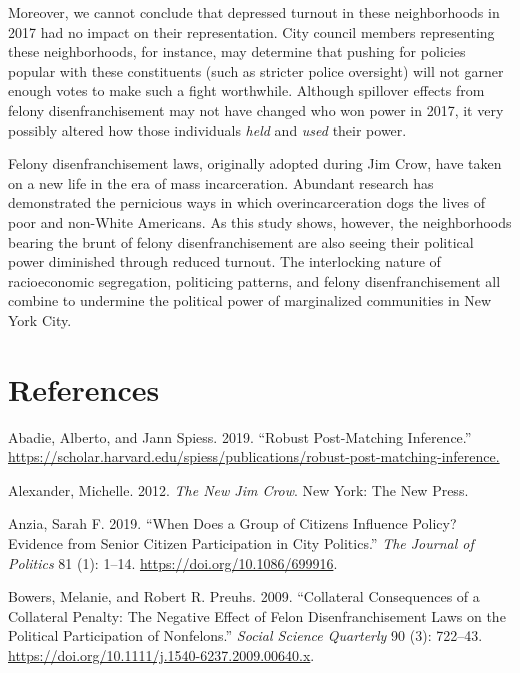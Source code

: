 \documentclass[12pt,]{article}
\begin{document}
Moreover, we cannot conclude that depressed turnout in these neighborhoods in 2017 had no impact on their representation. City council members representing these neighborhoods, for instance, may determine that pushing for policies popular with these constituents (such as stricter police oversight) will not garner enough votes to make such a fight worthwhile. Although spillover effects from felony disenfranchisement may not have changed who won power in 2017, it very possibly altered how those individuals \emph{held} and \emph{used} their power.

Felony disenfranchisement laws, originally adopted during Jim Crow, have taken on a new life in the era of mass incarceration. Abundant research has demonstrated the pernicious ways in which overincarceration dogs the lives of poor and non-White Americans. As this study shows, however, the neighborhoods bearing the brunt of felony disenfranchisement are also seeing their political power diminished through reduced turnout. The interlocking nature of racioeconomic segregation, politicing patterns, and felony disenfranchisement all combine to undermine the political power of marginalized communities in New York City.

\newpage

\hypertarget{references}{%
\section*{References}\label{references}}

\setlength{\parindent}{-0.5in}
\setlength{\leftskip}{0.5in}

\noindent

\hypertarget{refs}{}
\leavevmode\hypertarget{ref-Abadie2019}{}%
Abadie, Alberto, and Jann Spiess. 2019. ``Robust Post-Matching Inference.'' \url{https://scholar.harvard.edu/spiess/publications/robust-post-matching-inference.}

\leavevmode\hypertarget{ref-Alexander2012}{}%
Alexander, Michelle. 2012. \emph{The New Jim Crow}. New York: The New Press.

\leavevmode\hypertarget{ref-Anzia2019}{}%
Anzia, Sarah F. 2019. ``When Does a Group of Citizens Influence Policy? Evidence from Senior Citizen Participation in City Politics.'' \emph{The Journal of Politics} 81 (1): 1--14. \url{https://doi.org/10.1086/699916}.

\leavevmode\hypertarget{ref-Bowers2009}{}%
Bowers, Melanie, and Robert R. Preuhs. 2009. ``Collateral Consequences of a Collateral Penalty: The Negative Effect of Felon Disenfranchisement Laws on the Political Participation of Nonfelons.'' \emph{Social Science Quarterly} 90 (3): 722--43. \url{https://doi.org/10.1111/j.1540-6237.2009.00640.x}.
\end{document}
